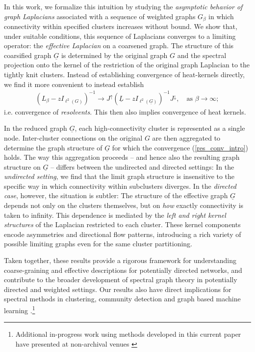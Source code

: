 \documentclass[reqno,12pt,letterpaper]{amsart}
\numberwithin{equation}{section}
\newcommand{\1}{\mathds{1}}
\theoremstyle{definition}
\begin{document}
\medskip

In this work, we formalize this intuition by studying the \emph{asymptotic behavior of graph Laplacians} associated with a sequence of weighted graphs $G_\beta$  in which connectivity within specified clusters increases without bound. We show that, under suitable conditions, this sequence of Laplacians converges to a limiting operator: the \emph{effective Laplacian} on a coarsened graph. The structure of this coarsified graph $\underline{G}$ is determined by the original graph $G$ and the 
spectral projection onto the kernel of the restriction of the original graph Laplacian to the tightly knit clusters.
 Instead of establishing convergence of heat-kernels directly, we find it more convenient to instead establish
 \begin{align}\label{res_conv_intro}
 		(L_\beta - z I_{\ell^2(G)})^{-1} \rightarrow  J^\uparrow  (\underline{L} - z I_{\ell^2(\underline{G})})^{-1} J^\downarrow, \quad \text{as $\beta \rightarrow \infty$};
\end{align}
i.e.  convergence of \emph{resolvents}.
This then also implies convergence of heat kernels.


\medskip
 In the  reduced graph $\underline{G}$, each high-connectivity cluster is represented as a single node. Inter-cluster connections on the original $G$ are then aggregated to determine the graph structure of $\underline{G}$ for which the convergence (\ref{res_conv_intro}) holds. The way this aggregation proceeds -- and hence also the resulting graph structure on $\underline{G}$ --
  differs between the undirected and directed settings: 
In the \emph{undirected setting}, we find that the limit graph structure is
insensitive to the specific way in which connectivity within subclusters diverges. 
In the \emph{directed case}, however, the situation is subtler: The structure of the effective graph $\underline{G}$ depends not only on the clusters themselves, but on  \emph{how} exactly connectivity is taken to infinity. This dependence is mediated by the \emph{left and right kernel structures} of the Laplacian restricted to each cluster. These kernel components encode asymmetries and directional flow patterns, introducing a rich variety of possible limiting graphs even for the same cluster partitioning. 

\medskip

Taken together, these results provide a rigorous framework for understanding coarse-graining and effective descriptions for potentially directed networks,
and contribute to the broader development of spectral graph theory in potentially directed and weighted settings.
Our results also have direct implications for spectral methods in clustering, 
community detection and graph based machine learning \cite{GraphScatteringBeyond, limitless, koke2024holonets}.\footnote{Additional in-progress work using methods developed in this current paper have presented at non-archival venues \cite{koke2023resolvnet, koke2024transferability, koke2025multiscale, koke2025graphscale, koke2025incorporating}}
\end{document}
